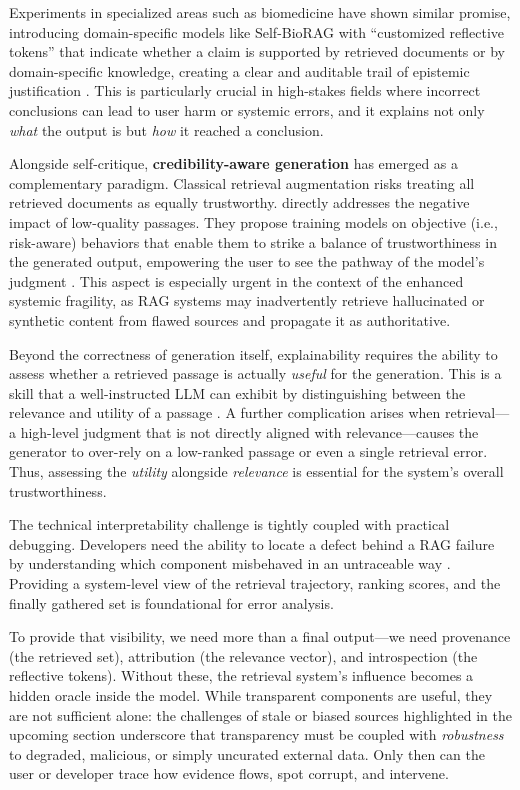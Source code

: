 \documentclass[11pt]{article}
\begin{document}
Experiments in specialized areas such as biomedicine have shown similar promise, introducing domain-specific models like Self-BioRAG with ``customized reflective tokens'' that indicate whether a claim is supported by retrieved documents or by domain-specific knowledge, creating a clear and auditable trail of epistemic justification \cite{ref176}. This is particularly crucial in high-stakes fields where incorrect conclusions can lead to user harm or systemic errors, and it explains not only \emph{what} the output is but \emph{how} it reached a conclusion.

Alongside self-critique, \textbf{credibility-aware generation} has emerged as a complementary paradigm. Classical retrieval augmentation risks treating all retrieved documents as equally trustworthy. \cite{ref239} directly addresses the negative impact of low-quality passages. They propose training models on objective (i.e., risk-aware) behaviors that enable them to strike a balance of trustworthiness in the generated output, empowering the user to see the pathway of the model's judgment \cite{ref239}. This aspect is especially urgent in the context of the enhanced systemic fragility, as RAG systems may inadvertently retrieve hallucinated or synthetic content from flawed sources and propagate it as authoritative.

Beyond the correctness of generation itself, explainability requires the ability to assess whether a retrieved passage is actually \emph{useful} for the generation. This is a skill that a well-instructed LLM can exhibit by distinguishing between the relevance and utility of a passage \cite{ref53}. A further complication arises when retrieval---a high-level judgment that is not directly aligned with relevance---causes the generator to over-rely on a low-ranked passage or even a single retrieval error. Thus, assessing the \emph{utility} alongside \emph{relevance} is essential for the system's overall trustworthiness.

The technical interpretability challenge is tightly coupled with practical debugging. Developers need the ability to locate a defect behind a RAG failure by understanding which component misbehaved in an untraceable way \cite{ref51}. Providing a system-level view of the retrieval trajectory, ranking scores, and the finally gathered set is foundational for error analysis.

To provide that visibility, we need more than a final output---we need provenance (the retrieved set), attribution (the relevance vector), and introspection (the reflective tokens). Without these, the retrieval system's influence becomes a hidden oracle inside the model. While transparent components are useful, they are not sufficient alone: the challenges of stale or biased sources highlighted in the upcoming section underscore that transparency must be coupled with \emph{robustness} to degraded, malicious, or simply uncurated external data. Only then can the user or developer trace how evidence flows, spot corrupt, and intervene.
\end{document}
